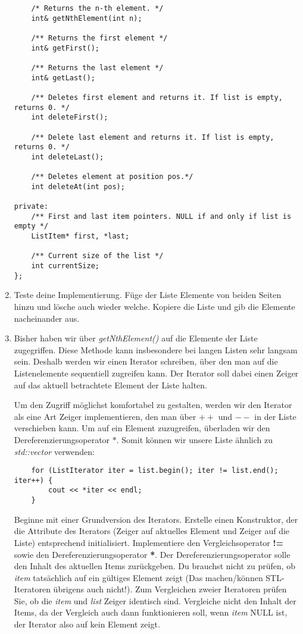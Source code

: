 \begin{enumerate}
\begin{lstlisting}
	/* Returns the n-th element. */
	int& getNthElement(int n);

	/** Returns the first element */
	int& getFirst();

	/** Returns the last element */
	int& getLast();

	/** Deletes first element and returns it. If list is empty, returns 0. */
	int deleteFirst();

	/** Delete last element and returns it. If list is empty, returns 0. */
	int deleteLast();
	
	/** Deletes element at position pos.*/
	int deleteAt(int pos);

private:
	/** First and last item pointers. NULL if and only if list is empty */
	ListItem* first, *last;
	
	/** Current size of the list */
	int currentSize;
};
\end{lstlisting}

\item
Teste deine Implementierung.
Füge der Liste Elemente von beiden Seiten hinzu und lösche auch wieder welche.
Kopiere die Liste und gib die Elemente nacheinander aus.

\item 
Bisher haben wir über \emph{getNthElement()} auf die Elemente der Liste zugegriffen.
Diese Methode kann insbesondere bei langen Listen sehr langsam sein.
Deshalb werden wir einen Iterator schreiben, über den man auf die Listenelemente sequentiell zugreifen kann.
Der Iterator soll dabei einen Zeiger auf das aktuell betrachtete Element der Liste halten.

Um den Zugriff möglichst komfortabel zu gestalten, werden wir den Iterator als eine Art Zeiger implementieren, den man über \textbf{$++$} und \textbf{$--$} in der Liste verschieben kann.
Um auf ein Element zuzugreifen, überladen wir den Dereferenzierungsoperator $*$.
Somit können wir unsere Liste ähnlich zu \emph{std::vector} verwenden:
\begin{lstlisting}
	for (ListIterator iter = list.begin(); iter != list.end(); iter++) {
		cout << *iter << endl;
	}
\end{lstlisting}

Beginne mit einer Grundversion des Iterators.
Erstelle einen Konstruktor, der die Attribute des Iterators (Zeiger auf aktuelles Element und Zeiger auf die Liste) entsprechend initialisiert.
Implementiere den Vergleichsoperator \textbf{!=} sowie den Dereferenzierungsoperator \textbf{*}.
Der Dereferenzierungsoperator solle den Inhalt des aktuellen Items zurückgeben.
Du brauchst nicht zu prüfen, ob \emph{item} tatsächlich auf ein gültiges Element zeigt (Das machen/können STL-Iteratoren übrigens auch nicht!).
Zum Vergleichen zweier Iteratoren prüfen Sie, ob die \emph{item} und \emph{list} Zeiger identisch sind.
Vergleiche nicht den Inhalt der Items, da der Vergleich auch dann funktionieren soll, wenn \emph{item} NULL ist, der Iterator also auf kein Element zeigt.  \\


\end{enumerate}
